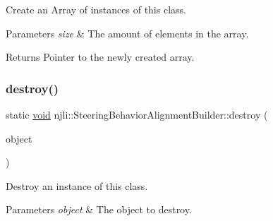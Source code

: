 Create an Array of instances of this class.


\begin{DoxyParams}{Parameters}
{\em size} & The amount of elements in the array.\\
\hline
\end{DoxyParams}
\begin{DoxyReturn}{Returns}
Pointer to the newly created array. 
\end{DoxyReturn}
\mbox{\label{classnjli_1_1_steering_behavior_alignment_builder_a45df5ac0cb661e03d677a058783d059e}} 
\subsubsection{\texorpdfstring{destroy()}{destroy()}}
{\footnotesize\ttfamily static \mbox{\hyperlink{_thread_8h_af1e856da2e658414cb2456cb6f7ebc66}{void}} njli\+::\+Steering\+Behavior\+Alignment\+Builder\+::destroy (\begin{DoxyParamCaption}\item[{\mbox{\hyperlink{classnjli_1_1_steering_behavior_alignment_builder}{Steering\+Behavior\+Alignment\+Builder}} $\ast$}]{object }\end{DoxyParamCaption})\hspace{0.3cm}{\ttfamily [static]}}

Destroy an instance of this class.


\begin{DoxyParams}{Parameters}
{\em object} & The object to destroy. \\
\hline
\end{DoxyParams}
\mbox{\label{classnjli_1_1_steering_behavior_alignment_builder_a55285efb47a45d6237e0232bb452dbab}} 
